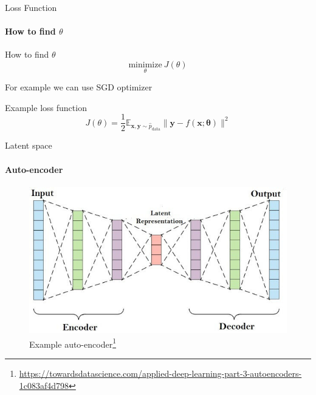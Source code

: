 \documentclass{beamer}
\begin{document}
\begin{frame}{Loss Function}
\framesubtitle{How to find $\theta$}
        
        \begin{block}{How to find $\theta$}
        \begin{equation}
        \underset{\theta}{\text{minimize}} \: J(\theta)    
        \end{equation}{}
        
        For example we can use SGD optimizer 
        
        \end{block}\pause
        
        \begin{block}{Example loss function}
        \begin{equation}
        J(\theta)=\frac{1}{2} \mathbb{E}_{\mathbf{x}, \mathbf{y} \sim \hat{p}_{\mathrm{data}}}\|\boldsymbol{y}-f(\boldsymbol{x} ; \boldsymbol{\theta})\|^{2}
        \end{equation}
        \end{block}
\end{frame}

\begin{frame}{Latent space}
\framesubtitle{Auto-encoder}

\begin{figure}
    \centering
    \includegraphics[width = .7\textwidth]{images/auto-encoder.jpg}
    \caption{Example auto-encoder\footnote{\url{https://towardsdatascience.com/applied-deep-learning-part-3-autoencoders-1c083af4d798}}}
\end{figure}{}
    
\end{frame}
\end{document}
